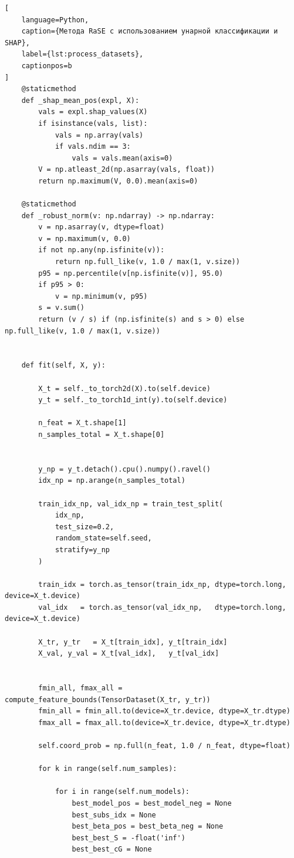 \documentclass[12pt,a4paper]{article}
\begin{document}
\begin{lstlisting}[
    language=Python,
    caption={Метода RaSE с использованием унарной классификации и SHAP},
    label={lst:process_datasets},
    captionpos=b
]
    @staticmethod
    def _shap_mean_pos(expl, X):
        vals = expl.shap_values(X)
        if isinstance(vals, list):
            vals = np.array(vals)
            if vals.ndim == 3: 
                vals = vals.mean(axis=0)
        V = np.atleast_2d(np.asarray(vals, float))
        return np.maximum(V, 0.0).mean(axis=0)

    @staticmethod
    def _robust_norm(v: np.ndarray) -> np.ndarray:
        v = np.asarray(v, dtype=float)
        v = np.maximum(v, 0.0)
        if not np.any(np.isfinite(v)):
            return np.full_like(v, 1.0 / max(1, v.size))
        p95 = np.percentile(v[np.isfinite(v)], 95.0)
        if p95 > 0:
            v = np.minimum(v, p95)
        s = v.sum()
        return (v / s) if (np.isfinite(s) and s > 0) else np.full_like(v, 1.0 / max(1, v.size))


    def fit(self, X, y):

        X_t = self._to_torch2d(X).to(self.device)
        y_t = self._to_torch1d_int(y).to(self.device)

        n_feat = X_t.shape[1]
        n_samples_total = X_t.shape[0]

    
        y_np = y_t.detach().cpu().numpy().ravel()
        idx_np = np.arange(n_samples_total)

        train_idx_np, val_idx_np = train_test_split(
            idx_np,
            test_size=0.2,
            random_state=self.seed,
            stratify=y_np
        )

        train_idx = torch.as_tensor(train_idx_np, dtype=torch.long, device=X_t.device)
        val_idx   = torch.as_tensor(val_idx_np,   dtype=torch.long, device=X_t.device)

        X_tr, y_tr   = X_t[train_idx], y_t[train_idx]
        X_val, y_val = X_t[val_idx],   y_t[val_idx]


        fmin_all, fmax_all = compute_feature_bounds(TensorDataset(X_tr, y_tr))
        fmin_all = fmin_all.to(device=X_tr.device, dtype=X_tr.dtype)
        fmax_all = fmax_all.to(device=X_tr.device, dtype=X_tr.dtype)

        self.coord_prob = np.full(n_feat, 1.0 / n_feat, dtype=float)

        for k in range(self.num_samples):

            for i in range(self.num_models):
                best_model_pos = best_model_neg = None
                best_subs_idx = None
                best_beta_pos = best_beta_neg = None
                best_best_S = -float('inf')
                best_best_cG = None


\end{lstlisting}
\end{document}
